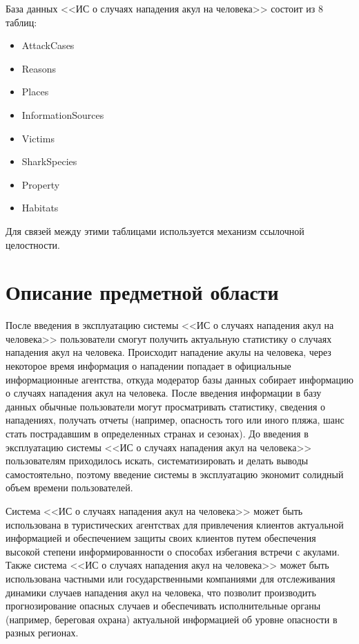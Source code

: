 \documentclass[russian,utf8,simple,emptystyle]{eskdtext}
\begin{document}
База данных <<ИС о случаях нападения акул на человека>> состоит из 8 таблиц:
\begin{itemize}
\item AttackCases
\item Reasons
\item Places
\item InformationSources
\item Victims
\item SharkSpecies
\item Property
\item Habitats
\end{itemize}

Для связей между этими таблицами используется механизм ссылочной целостности.
\clearpage

\section{Описание предметной области}
После введения в эксплуатацию системы <<ИС о случаях нападения акул на человека>> пользователи смогут получить актуальную статистику о случаях нападения акул на человека. Происходит нападение акулы на человека, через некоторое время информация о нападении попадает в официальные информационные агентства, откуда модератор базы данных собирает информацию о случаях нападения акул на человека. После введения информации в базу данных обычные пользователи могут просматривать статистику, сведения о нападениях, получать отчеты (например, опасность того или иного пляжа, шанс стать пострадавшим в определенных странах и сезонах). До введения в эксплуатацию системы <<ИС о случаях нападения акул на человека>> пользователям приходилось искать, систематизировать и делать выводы самостоятельно, поэтому введение системы в эксплуатацию экономит солидный объем времени пользователей.

Система <<ИС о случаях нападения акул на человека>> может быть использована в туристических агентствах для привлечения клиентов актуальной информацией и обеспечением защиты своих клиентов путем обеспечения высокой степени информированности о способах избегания встречи с акулами. Также система <<ИС о случаях нападения акул на человека>> может быть использована частными или государственными компаниями для отслеживания динамики случаев нападения акул на человека, что позволит производить прогнозирование опасных случаев и обеспечивать исполнительные органы (например, береговая охрана) актуальной информацией об уровне опасности в разных регионах.
\clearpage
\end{document}
